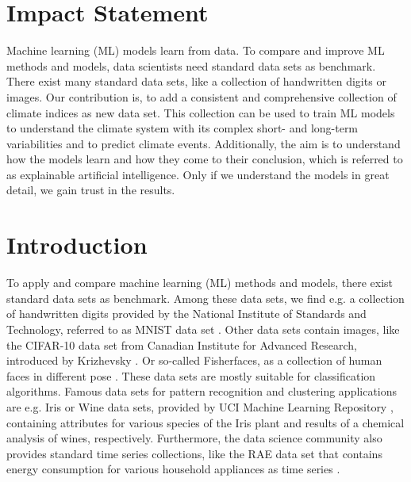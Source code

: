 \documentclass{CUP-JNL-DTM}%
\theoremstyle{definition}
\numberwithin{equation}{section}
\begin{document}
\section*{Impact Statement}
Machine learning (ML) models learn from data. To compare and improve ML methods and models, data scientists need standard data sets as benchmark. There exist many standard data sets, like a collection of handwritten digits or images. Our contribution is, to add a consistent and comprehensive collection of climate indices as new data set. This collection can be used to train ML models to understand the climate system with its complex short- and long-term variabilities and to predict climate events. Additionally, the aim is to understand how the models learn and how they come to their conclusion, which is referred to as explainable artificial intelligence. Only if we understand the models in great detail, we gain trust in the results.

\section{Introduction \label{sec:Introduction}}

To apply and compare machine learning (ML) methods and models, there exist standard data sets as benchmark. Among these data sets, we find e.g. a collection of handwritten digits provided by the National Institute of Standards and Technology, referred to as MNIST data set \cite{Lecun1998}. Other data sets contain images, like the CIFAR-10 data set from Canadian Institute for Advanced Research, introduced by Krizhevsky \cite{Krizhevsky2009}. Or so-called Fisherfaces, as a collection of human faces in different pose \cite{Belhumeur1997}. These data sets are mostly suitable for classification algorithms. Famous data sets for pattern recognition and clustering applications are e.g. Iris or Wine data sets, provided by UCI Machine Learning Repository \cite{Murphy1994}, containing attributes for various species of the Iris plant and results of a chemical analysis of wines, respectively. Furthermore, the data science community also provides standard time series collections, like the RAE data set that contains energy consumption for various household appliances as time series \cite{Makonin2018}. 
\end{document}
